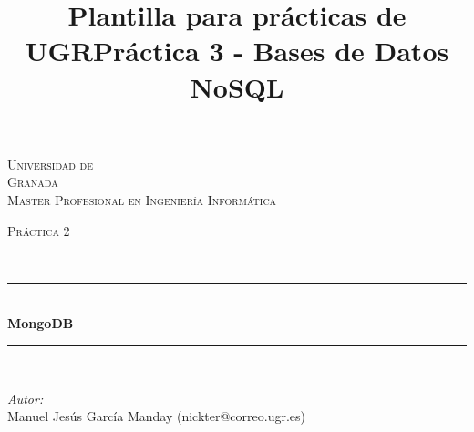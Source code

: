 \documentclass[10pt]{article}
\title{Plantilla para prácticas de UGR}
\title{Práctica 3 - Bases de Datos NoSQL}
\begin{document}
\begin{center}																		%
\newcommand{\HRule}{\rule{\linewidth}{0.5mm}}									%
\begin{minipage}{0.48\textwidth} \begin{flushleft}
\end{flushleft}\end{minipage}
\begin{minipage}{0.48\textwidth} \begin{flushright}
\end{flushright}\end{minipage}

\vspace*{-1.5cm}								%
\textsc{\huge Universidad de\\ \vspace{5px} Granada}\\[1.5cm]	

\textsc{\LARGE Master Profesional en Ingenier\'ia Inform\'atica }\\[1.5cm]													%

\begin{minipage}{0.9\textwidth} 
\begin{center}																					%
\textsc{\LARGE Pr\'actica 2}
\end{center}
\end{minipage}\\[0.5cm]
 			\vspace*{1cm}																		%
\HRule \\[0.4cm]																	%
{ \huge \bfseries MongoDB}\\[0.4cm]	%
\HRule \\[1.5cm]																	%
\begin{minipage}{0.46\textwidth}													%
\begin{flushleft} \large															%
\emph{Autor:}\\	
Manuel Jes\'us Garc\'ia Manday (nickter@correo.ugr.es)\\
\end{flushleft}																		%
\end{minipage}		
\begin{minipage}{0.52\textwidth}		
\vspace{-0.6cm}											%
\begin{flushright} \large															%
\end{flushright}																	%
\end{minipage}	
\vspace*{1cm}
 	

\end{center}
\end{document}
